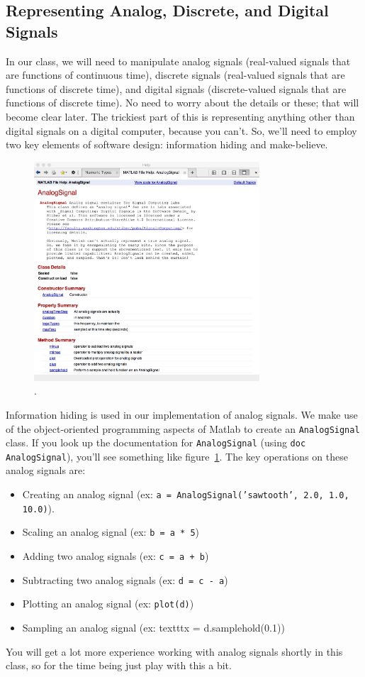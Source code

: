 \subsection{Representing Analog, Discrete, and Digital Signals}

In our class, we will need to manipulate analog signals (real-valued
signals that are functions of continuous time), discrete signals
(real-valued signals that are functions of discrete time), and digital
signals (discrete-valued signals that are functions of discrete
time). No need to worry about the details or these; that will become
clear later. The trickiest part of this is representing anything other
than digital signals on a digital computer, because you can't. So,
we'll need to employ two key elements of software design: information
hiding and make-believe.

\begin{figure}
\begin{center}
\includegraphics[width=0.75\textwidth]{lab1/AnalogSignal-help}
\end{center}
\caption{.\label{fg:analogsignal-help}}
\end{figure}

Information hiding is used in our implementation of analog signals. We
make use of the object-oriented programming aspects of Matlab to
create an \texttt{AnalogSignal} class. If you look up the documentation
for \texttt{AnalogSignal} (using \texttt{doc AnalogSignal}), you'll
see something like figure~\ref{fg:analogsignal-help}. The key
operations on these analog signals are:
\begin{itemize}
\item Creating an analog signal (ex: \texttt{a =
    AnalogSignal('sawtooth', 2.0, 1.0, 10.0)}).
\item Scaling an analog signal (ex: \texttt{b = a * 5})
\item Adding two analog signals (ex: \texttt{c = a + b})
\item Subtracting two analog signals (ex: \texttt{d = c - a})
\item Plotting an analog signal (ex: \texttt{plot(d)})
\item Sampling an analog signal (ex: texttt{x = d.samplehold(0.1)})
\end{itemize}

You will get a lot more experience working with analog signals shortly
in this class, so for the time being just play with this a bit.


